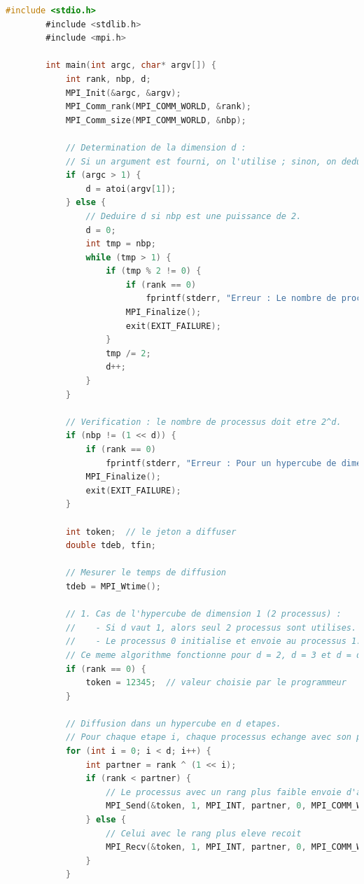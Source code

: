 \documentclass[a4paper,13pt]{book}
\begin{document}
	\begin{lstlisting}[language=C]
        #include <stdio.h>
        #include <stdlib.h>
        #include <mpi.h>
        
        int main(int argc, char* argv[]) {
            int rank, nbp, d;
            MPI_Init(&argc, &argv);
            MPI_Comm_rank(MPI_COMM_WORLD, &rank);
            MPI_Comm_size(MPI_COMM_WORLD, &nbp);
        
            // Determination de la dimension d :
            // Si un argument est fourni, on l'utilise ; sinon, on deduit d a partir du nb de processus.
            if (argc > 1) {
                d = atoi(argv[1]);
            } else {
                // Deduire d si nbp est une puissance de 2.
                d = 0;
                int tmp = nbp;
                while (tmp > 1) {
                    if (tmp % 2 != 0) {
                        if (rank == 0)
                            fprintf(stderr, "Erreur : Le nombre de processus doit etre une puissance de 2.\n");
                        MPI_Finalize();
                        exit(EXIT_FAILURE);
                    }
                    tmp /= 2;
                    d++;
                }
            }
        
            // Verification : le nombre de processus doit etre 2^d.
            if (nbp != (1 << d)) {
                if (rank == 0)
                    fprintf(stderr, "Erreur : Pour un hypercube de dimension %d, il faut 2^d processus (ici %d processus).\n", d, nbp);
                MPI_Finalize();
                exit(EXIT_FAILURE);
            }
        
            int token;  // le jeton a diffuser
            double tdeb, tfin;
            
            // Mesurer le temps de diffusion
            tdeb = MPI_Wtime();
        
            // 1. Cas de l'hypercube de dimension 1 (2 processus) :
            //    - Si d vaut 1, alors seul 2 processus sont utilises.
            //    - Le processus 0 initialise et envoie au processus 1.
            // Ce meme algorithme fonctionne pour d = 2, d = 3 et d = d general.
            if (rank == 0) {
                token = 12345;  // valeur choisie par le programmeur
            }
            
            // Diffusion dans un hypercube en d etapes.
            // Pour chaque etape i, chaque processus echange avec son partenaire defini par rank xor (1 << i).
            for (int i = 0; i < d; i++) {
                int partner = rank ^ (1 << i);
                if (rank < partner) {
                    // Le processus avec un rang plus faible envoie d'abord
                    MPI_Send(&token, 1, MPI_INT, partner, 0, MPI_COMM_WORLD);
                } else {
                    // Celui avec le rang plus eleve recoit
                    MPI_Recv(&token, 1, MPI_INT, partner, 0, MPI_COMM_WORLD, MPI_STATUS_IGNORE);
                }
            }
            

\end{lstlisting}
\end{document}

